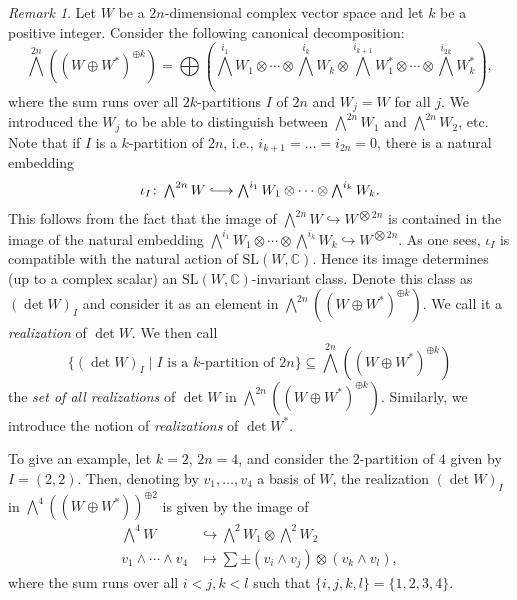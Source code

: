 \documentclass[11pt,twoside,a4paper]{amsart}
\newcommand{\0}{\mathscr{O}}
\newcommand{\C}{\mathbb{C}}
\theoremstyle{plain}
\theoremstyle{definition}
\theoremstyle{remark}
\newtheorem{rmk}[thm]{Remark}
\begin{document}
\begin{rmk}
\label{rmk.: all possible realizations of determinants}
Let $W$ be a $2n$-dimensional complex vector space and let $k$ be a positive integer. Consider the following canonical decomposition:
\[
\textstyle
\bigwedge^{2n}((W\oplus W^*)^{\oplus k})=\bigoplus \left( \bigwedge^{i_1}W_1\otimes\cdots\otimes \bigwedge^{i_k}W_k\otimes \bigwedge^{i_{k+1}}W_1^*\otimes\cdots\otimes \bigwedge^{i_{2k}}W_k^*
\right),
\]
where the sum runs over all $2k$-partitions $I$ of $2n$ and $W_j=W$ for all $j$. We introduced the $W_j$ to be able to distinguish between 
$\bigwedge^{2n}W_1$ and $\bigwedge^{2n}W_2$, etc. 
Note that if $I$ is a $k$-partition of $2n$, i.e., $i_{k+1}=\ldots= i_{2n}=0$, there is a natural embedding
\[
\textstyle\iota_{I}\colon\bigwedge^{2n}W\lhook\joinrel\longrightarrow \bigwedge^{i_1}W_1\otimes\cdots\otimes \bigwedge^{i_k}W_k.
\]
This follows from the fact that the image of $\bigwedge^{2n}W\hookrightarrow W^{\bigotimes 2n}$ is contained in the image of the natural embedding $\bigwedge^{i_1}W_1\otimes\cdots\otimes \bigwedge^{i_k}W_k \hookrightarrow W^{\bigotimes 2n}$. 
As one sees, $\iota_I$ is compatible with the natural action of $\mathrm{SL}(W,\C)$. Hence its image determines (up to a complex scalar) an $\mathrm{SL}(W,\C)$-invariant class. Denote this class as $(\det W)_I$ and consider it as an element in $\bigwedge^{2n}\left((W\oplus W^*)^{\oplus k}\right)$. We call it a \textit{realization} of $\det W$. 
We then call
\[
\{\textstyle(\det W)_I\;|\; I\text{ is a } k\text{-partition of } 2n\}\subseteq \bigwedge^{2n}\left((W\oplus W^*)^{\oplus k}\right)
\]
the \textit{set of all realizations} of $\det W$ in $\bigwedge^{2n}\left((W\oplus W^*)^{\oplus k}\right)$. 
Similarly, we introduce the notion of \textit{realizations} of $\det W^*$.

\smallskip

To give an example, let $k=2$, $2n=4$, and consider the $2$-partition of $4$ given by $I=(2,2)$. Then, denoting by $v_1,\ldots, v_4$ a basis of $W$, the realization $(\det W)_I$ in $\bigwedge^{4}\left((W\oplus W^*)\right)^{\oplus 2}$ is given by the image of
\begin{align*}
 \textstyle\bigwedge^4W &\textstyle\hookrightarrow \bigwedge^2W_1\otimes\bigwedge^2W_2\\
  v_1\wedge\cdots\wedge v_4&\mapsto \sum\pm (v_i\wedge v_j)\otimes (v_k\wedge v_l),
\end{align*}
where the sum runs over all $i<j,k<l$ such that $\{i,j,k,l\}=\{1,2,3,4\}$.
\end{rmk}
\end{document}
